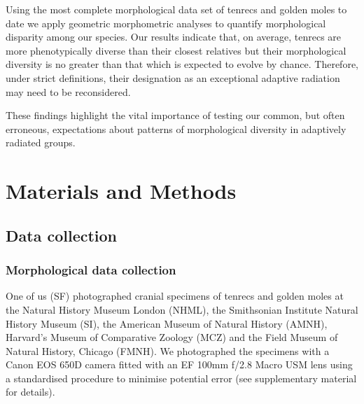\documentclass[12pt,a4paper]{article}
\begin{document}
Using the most complete morphological data set of tenrecs and golden moles to date  we apply geometric morphometric analyses \citep{Rohlf1993, Zelditch2012} to quantify morphological disparity among our species. Our results indicate that, on average, tenrecs are more phenotypically diverse than their closest relatives but their morphological diversity is no greater than that which is expected to evolve by chance. Therefore, under strict definitions, their designation as an exceptional adaptive radiation may need to be reconsidered. 

These findings highlight the vital importance of testing our common, but often erroneous, expectations about patterns of morphological diversity in adaptively radiated groups. 

\section{Materials and Methods}

\subsection{Data collection} %

\subsubsection{Morphological data collection} %

	
One of us (SF) photographed cranial specimens of tenrecs and golden moles at the Natural History Museum London (NHML), the Smithsonian Institute Natural History Museum (SI), the American Museum of Natural History (AMNH), Harvard's Museum of Comparative Zoology (MCZ) and the Field Museum of Natural History, Chicago (FMNH). We photographed the specimens with a Canon EOS 650D camera fitted with an EF 100mm f/2.8 Macro USM lens using a standardised procedure to minimise potential error (see supplementary material for details). 
\end{document}
